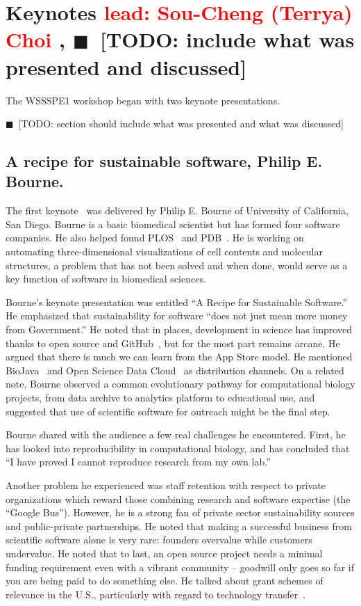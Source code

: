 \documentclass[11pt, oneside]{amsart}
\newcommand{\todo}[1]{{\color{blue}$\blacksquare$~\textsf{[TODO: #1]}}}
\newcommand{\note}[1]{ {\textcolor{red}    { #1 }}}
\begin{document}
\section{Keynotes\scriptsize{\note{lead: Sou-Cheng (Terrya) Choi}, \todo{include what was presented and discussed}}} \label{sec:keynotes}

The WSSSPE1 workshop began with two keynote presentations.

\todo{section should include what was presented and what was discussed}

\subsection{A recipe for sustainable software, Philip E. Bourne.}

The first keynote~\cite{WSSSPE1-keynote1} was delivered by Philip
E. Bourne of University of California, San Diego.  Bourne is a basic
biomedical scientist but has formed four software companies. He also
helped found PLOS~\cite{plos-web} and PDB~\cite{pdb-web}.  He is working on automating
three-dimensional visualizations of cell contents and molecular
structures, a problem that has not been solved and when done, would
serve as a key function of software in biomedical sciences.

Bourne's keynote presentation was entitled ``A Recipe for Sustainable
Software.''  He emphasized that sustainability for software ``does not just
mean more money from Government.''  He noted that in places, development in
science has improved thanks to open source and GitHub~\cite{github-web}, but for the most part
remains arcane. He argued that there is much we can learn from the App Store
model. He mentioned BioJava~\cite{biojava-web} and
Open Science Data Cloud~\cite{osdc-web} as distribution channels.  On a related
note, Bourne observed a common evolutionary pathway for computational biology
projects, from data archive to analytics platform to educational use, and
suggested that use of scientific software for outreach might be the final step.

Bourne shared with the audience a few real challenges he encountered. First, he
has looked into reproducibility in computational biology, and has concluded
that ``I have proved I cannot reproduce research from my own
lab.''~\cite{Veretnik}

Another problem he experienced was staff retention with respect to private
organizations which reward those combining research and software expertise (the
``Google Bus''). However, he is a strong fan of private sector sustainability
sources and public-private partnerships. He noted that making a successful
business from scientific software alone is very rare: founders overvalue while
customers undervalue. He noted that to last, an open source project needs a
minimal funding requirement even with a vibrant community -- goodwill only goes
so far if you are being paid to do something else.  He talked about grant
schemes of relevance in the U.S., particularly with regard to technology
transfer~\cite{sbir-web, fased-web}.
\end{document}
